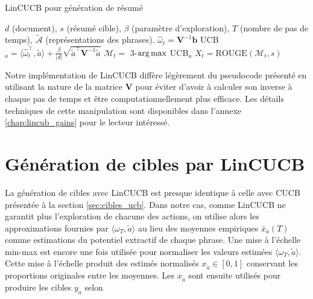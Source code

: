 \begin{algorithm}
    \caption{LinCUCB pour génération de résumé}
    \begin{algorithmic}[1]
        \Require $d$ (document), $s$ (résumé cible), $\beta$ (paramètre d'exploration), $T$ (nombre de pas de temps), $\tilde{\mathcal{A}}$ (représentations des phrases).
        \State $\hat{\omega}_t = \mathbf{V}^{-1}\mathbf{b}$
        \State UCB$_a = \langle \hat{\omega}_t^\top, \tilde{a} \rangle + \frac{\beta}{|d|}\sqrt{\tilde{a}^\top \mathbf{V}^{-1} \tilde{a}}$
        \EndFor
        \State $\mathcal{M}_t =$ 3-$\operatorname*{arg\,max}$ UCB$_a$
        \State $X_t = \text{ROUGE}(\mathcal{M}_t, s)$
        \EndFor
        \EndFor
    \end{algorithmic}
    \label{alg:cible_linucb}
\end{algorithm}

Notre implémentation de LinCUCB diffère légèrement du pseudocode présenté 
en utilisant la nature de la matrice $\mathbf{V}$ pour éviter d'avoir 
à calculer son inverse à chaque pas de temps et être computationnellement plus efficace.
Les détails techniques de cette manipulation sont disponibles dans l'annexe 
\ref{chap:lincub_gains} pour le lecteur intéressé.

\section{Génération de cibles par LinCUCB}
\label{sec:cibles_linucb}

La génération de cibles avec LinCUCB est presque identique
à celle avec CUCB présentée à la section \ref{sec:cibles_ucb}.
Dans notre cas, comme LinCUCB ne garantit plus l'exploration de chacune des 
actions, on utilise alors les approximations fournies par $\langle \omega_T, \tilde{a} \rangle$
au lieu des moyennes empiriques $\bar{x}_a(T)$ comme estimations du potentiel 
extractif de chaque phrase.
Une mise à l'échelle min-max est encore une fois utilisée pour
normaliser les valeurs estimées $\langle \omega_T, \tilde{a} \rangle$.
Cette mise à l'échelle produit des estimés normalisés $x_{\tilde{a}} \in [0, 1]$
conservant les proportions originales entre les moyennes.
Les $x_{\tilde{a}}$ sont ensuite utilisés pour produire les cibles $y_a$ selon

